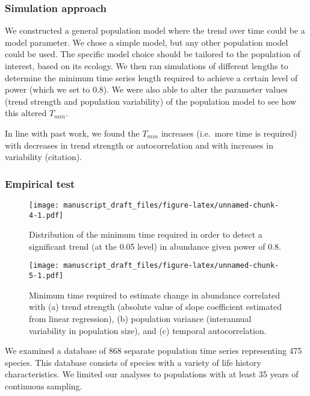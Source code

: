 \documentclass[12pt,]{article}
\begin{document}
\subsubsection{Simulation approach}\label{simulation-approach}

We constructed a general population model where the trend over time
could be a model parameter. We chose a simple model, but any other
population model could be used. The specific model choice should be
tailored to the population of interest, based on its ecology. We then
ran simulations of different lengths to determine the minimum time
series length required to achieve a certain level of power (which we set
to 0.8). We were also able to alter the parameter values (trend strength
and population variability) of the population model to see how this
altered \(T_{min}\).

In line with past work, we found the \(T_{min}\) increases (i.e.~more
time is required) with decreases in trend strength or autocorrelation
and with increases in variability (citation).

\subsubsection{Empirical test}\label{empirical-test}

\begin{figure}[htbp]
\centering
\texttt{[image: manuscript\_draft\_files/figure-latex/unnamed-chunk-4-1.pdf]}
\caption{Distribution of the minimum time required in order to detect a
significant trend (at the 0.05 level) in abundance given power of
0.8.\label{fig:min_time_dist}}
\end{figure}

\begin{figure}[htbp]
\centering
\texttt{[image: manuscript\_draft\_files/figure-latex/unnamed-chunk-5-1.pdf]}
\caption{Minimum time required to estimate change in abundance
correlated with (a) trend strength (absolute value of slope coefficient
estimated from linear regression), (b) population variance (interannual
variability in population size), and (c) temporal
autocorrelation.\label{fig:correlates}}
\end{figure}

We examined a database of 868 separate population time series
representing 475 species. This database consists of species with a
variety of life history characteristics. We limited our analyses to
populations with at least 35 years of continuous sampling.
\end{document}
